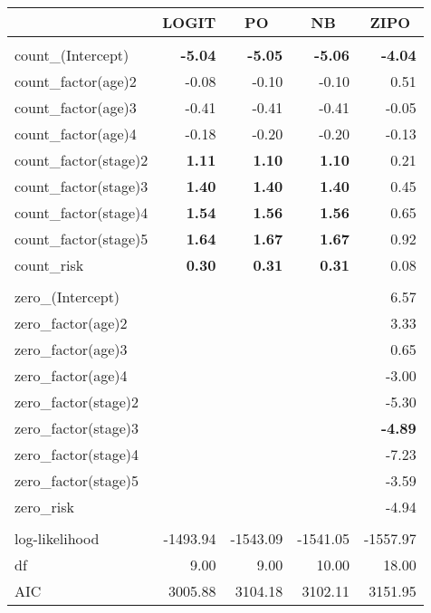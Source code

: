 \begin{table}[!tbp]
\begin{center}
\begin{tabular}{lrrrr}
\toprule
\multicolumn{1}{l}{}&\multicolumn{1}{c}{LOGIT}&\multicolumn{1}{c}{PO}&\multicolumn{1}{c}{NB}&\multicolumn{1}{c}{ZIPO}\tabularnewline
\midrule
&&&&\tabularnewline
   count\_(Intercept)&\bfseries      -5.04&\bfseries      -5.05&\bfseries      -5.06&\bfseries      -4.04\tabularnewline
   count\_factor(age)2&      -0.08&      -0.10&      -0.10&       0.51\tabularnewline
   count\_factor(age)3&      -0.41&      -0.41&      -0.41&      -0.05\tabularnewline
   count\_factor(age)4&      -0.18&      -0.20&      -0.20&      -0.13\tabularnewline
   count\_factor(stage)2&\bfseries       1.11&\bfseries       1.10&\bfseries       1.10&       0.21\tabularnewline
   count\_factor(stage)3&\bfseries       1.40&\bfseries       1.40&\bfseries       1.40&       0.45\tabularnewline
   count\_factor(stage)4&\bfseries       1.54&\bfseries       1.56&\bfseries       1.56&       0.65\tabularnewline
   count\_factor(stage)5&\bfseries       1.64&\bfseries       1.67&\bfseries       1.67&       0.92\tabularnewline
   count\_risk&\bfseries       0.30&\bfseries       0.31&\bfseries       0.31&       0.08\tabularnewline
\midrule
&&&&\tabularnewline
   zero\_(Intercept)&   &   &   &       6.57\tabularnewline
   zero\_factor(age)2&   &   &   &       3.33\tabularnewline
   zero\_factor(age)3&   &   &   &       0.65\tabularnewline
   zero\_factor(age)4&   &   &   &      -3.00\tabularnewline
   zero\_factor(stage)2&   &   &   &      -5.30\tabularnewline
   zero\_factor(stage)3&   &   &   &\bfseries      -4.89\tabularnewline
   zero\_factor(stage)4&   &   &   &      -7.23\tabularnewline
   zero\_factor(stage)5&   &   &   &      -3.59\tabularnewline
   zero\_risk&   &   &   &      -4.94\tabularnewline
\midrule
&&&&\tabularnewline
   log-likelihood&   -1493.94&   -1543.09&   -1541.05&   -1557.97\tabularnewline
   df&       9.00&       9.00&      10.00&      18.00\tabularnewline
   AIC&    3005.88&    3104.18&    3102.11&    3151.95\tabularnewline
\bottomrule
\end{tabular}\end{center}

\end{table}
